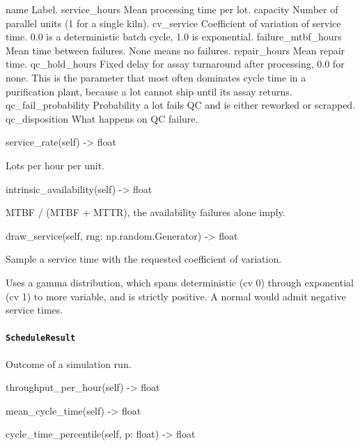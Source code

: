 \documentclass[10pt,a4paper,twoside]{report}
\begin{document}
name Label. service\_hours Mean processing time per lot. capacity Number of parallel units (1 for a single kiln). cv\_service Coefficient of variation of service time. 0.0 is a deterministic batch cycle, 1.0 is exponential. failure\_mtbf\_hours Mean time between failures. None means no failures. repair\_hours Mean repair time. qc\_hold\_hours Fixed delay for assay turnaround after processing, 0.0 for none. This is the parameter that most often dominates cycle time in a purification plant, because a lot cannot ship until its assay returns. qc\_fail\_probability Probability a lot fails QC and is either reworked or scrapped. qc\_disposition What happens on QC failure.

\begin{verbatimsmall}
service_rate(self) -> float
\end{verbatimsmall}

Lots per hour per unit.

\begin{verbatimsmall}
intrinsic_availability(self) -> float
\end{verbatimsmall}

MTBF / (MTBF + MTTR), the availability failures alone imply.

\begin{verbatimsmall}
draw_service(self, rng: np.random.Generator) -> float
\end{verbatimsmall}

Sample a service time with the requested coefficient of variation.

Uses a gamma distribution, which spans deterministic (cv 0) through exponential (cv 1) to more variable, and is strictly positive. A normal would admit negative service times.

\paragraph{\texttt{ScheduleResult}}

Outcome of a simulation run.

\begin{verbatimsmall}
throughput_per_hour(self) -> float
\end{verbatimsmall}

\begin{verbatimsmall}
mean_cycle_time(self) -> float
\end{verbatimsmall}

\begin{verbatimsmall}
cycle_time_percentile(self, p: float) -> float
\end{verbatimsmall}
\end{document}

